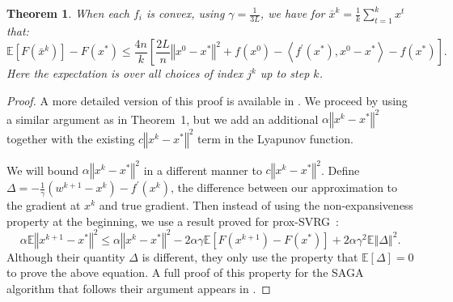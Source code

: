 \documentclass{article}
\newtheorem{thm}{Theorem}
\newcommand{\stepsize}{\gamma} %
\begin{document}
\begin{thm}
When each $f_{i}$ is convex, using $\stepsize=\frac{1}{3L}$,
we have for $\bar{x}^{k}=\frac{1}{k}\sum_{t=1}^{k}x^{t}$ that:
\[
\mathbb{E}\left[F(\bar{x}^{k})\right]-F(x^{*})\leq\frac{4n}{k}\left[\frac{2L}{n}\left\Vert x^{0}-x^{*}\right\Vert ^{2}+f(x^{0})-\left\langle f^{\prime}(x^{*}),x^{0}-x^{*}\right\rangle -f(x^{*})\right].
\]
Here the expectation is over all choices of index $j^{k}$ up to step $k$. 
\end{thm}
\begin{proof}
A more detailed version of this proof is available in \citep{adefazio-thesis2014}.
We proceed by using a similar argument as in Theorem~1, %
but we add an additional $\alpha\left\Vert x^k-x^{*}\right\Vert ^{2}$
together with the existing $c\left\Vert x^k-x^{*}\right\Vert ^{2}$
term in the Lyapunov function.

We will bound $\alpha\left\Vert x^k-x^{*}\right\Vert ^{2}$ in a different
manner to $c\left\Vert x^k-x^{*}\right\Vert ^{2}$. Define $\Delta=-\frac{1}{\stepsize}\left(w^{k+1}-x^k\right)-f^{\prime}(x^k)$,
the difference between our approximation to the gradient at $x^k$ and
true gradient. Then instead of using the non-expansiveness property
at the beginning, we use a result proved for prox-SVRG~\cite[2nd eq. on p.12]{prox-svrg}:
\[
\alpha \mathbb{E}\left\Vert x^{k+1}-x^{*}\right\Vert ^{2}\leq\alpha\left\Vert x^k-x^{*}\right\Vert ^{2}-2\alpha\stepsize\mathbb{E}\left[F(x^{k+1})-F(x^{*})\right]+2\alpha\stepsize^{2}\mathbb{E}\left\Vert \Delta\right\Vert ^{2}.
\]
Although their quantity $\Delta$ is different, they only use the
property that $\mathbb{E}[\Delta]=0$ to prove the above equation. A full proof of this property for the SAGA algorithm that follows their argument appears in \citep{adefazio-thesis2014}.


\end{proof}
\end{document}
